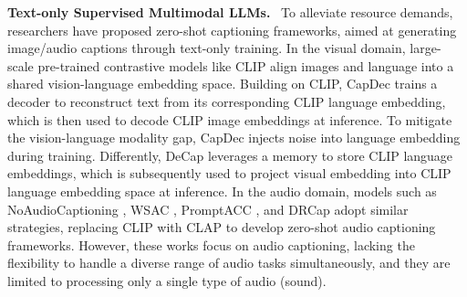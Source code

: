\textbf{Text-only Supervised Multimodal LLMs.} \
To alleviate resource demands, researchers have proposed zero-shot captioning frameworks, aimed at generating image/audio captions through text-only training. In the visual domain, large-scale pre-trained contrastive models like CLIP \citep{radford2021learning} align images and language into a shared vision-language embedding space. Building on CLIP, 
CapDec \citep{DBLP:conf/emnlp/NukraiMG22} trains a decoder to reconstruct text from its corresponding CLIP language embedding,  which is then used to decode CLIP image embeddings at inference. To mitigate the vision-language modality gap, CapDec injects noise into language embedding during training.  Differently, DeCap \citep{li2023decapdecodingcliplatents} leverages a memory to store CLIP language embeddings, which is  subsequently used to project visual embedding into CLIP language embedding space at inference.  In the audio domain, models such as NoAudioCaptioning \citep{deshmukh2024training}, WSAC \citep{kouzelis2023weaklysupervisedautomatedaudiocaptioning}, PromptACC \citep{zhang2024zeroshotaudiocaptioningusing}, and DRCap \citep{li2024drcapdecodingclaplatents} adopt similar strategies, replacing CLIP with CLAP to develop zero-shot audio captioning frameworks. %
However, these works focus on audio captioning, lacking the flexibility to handle a diverse range of audio tasks simultaneously, and they are limited to processing only a single type of audio (sound).